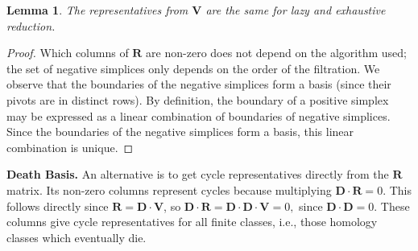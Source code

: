 \documentclass[10pt,a4paper]{article}
\newtheorem{lemma}[theorem]{Lemma}
\newcommand{\mat}[1]{\mathbf{#1}}
\renewcommand{\paragraph}[1]{\noindent\textbf{#1.}}
\begin{document}
\begin{lemma}
The representatives from $\mat{V}$ are the same for lazy and exhaustive reduction.
\end{lemma}
\begin{proof}
    Which columns of $\mat{R}$ are non-zero does not depend on the algorithm used; the set of negative simplices only depends on the order of the filtration. We observe that the boundaries of the negative simplices form a basis (since their pivots are in distinct rows). By definition, the boundary of a positive simplex may be expressed as a linear combination of boundaries of negative simplices.
Since the boundaries of the negative simplices form a basis, this linear combination is unique. 
\end{proof}


\paragraph{\textbf{Death Basis}} An alternative is to get cycle representatives directly from the $\mat{R}$ matrix. Its non-zero columns represent cycles because multiplying $\mat{D}\cdot \mat{R} = 0$. This follows directly since $\mat{R}= \mat{D}\cdot\mat{V} $, so  
$\mat{D}\cdot \mat{R} =  \mat{D}\cdot \mat{D}\cdot\mat{V} = 0,$
since $\mat{D}\cdot \mat{D} =0.$
These columns give cycle representatives for all finite classes, i.e., those homology classes which eventually die.
\end{document}
